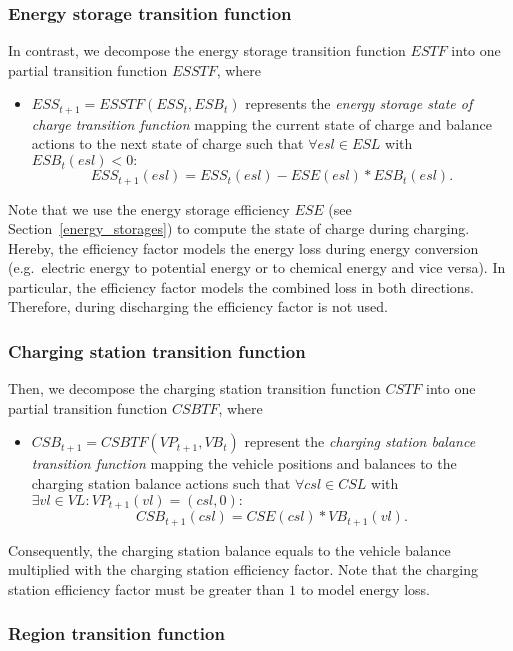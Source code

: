 \subsubsection{Energy storage transition function}
\label{transitions_storages}

In contrast, we decompose the energy storage transition function $ESTF$ into one partial transition function $ESSTF$, where
\begin{itemize}
	\item $ESS_{t+1} = ESSTF(ESS_t, ESB_t)$ represents the \textit{energy storage state of charge transition function} mapping the current state of charge and balance actions to the next state of charge such that $\forall esl \in ESL$ with $ESB_t(esl) < 0:$
	\[
		ESS_{t+1}(esl) = ESS_t(esl) - ESE(esl) * ESB_t(esl) \textrm{.}
	\]
\end{itemize}
Note that we use the energy storage efficiency $ESE$ (see Section~\ref{energy_storages}) to compute the state of charge during charging. Hereby, the efficiency factor models the energy loss during energy conversion (e.g.\ electric energy to potential energy or to chemical energy and vice versa). In particular, the efficiency factor models the combined loss in both directions. Therefore, during discharging the efficiency factor is not used.

\subsubsection{Charging station transition function}
\label{transitions_stations}

Then, we decompose the charging station transition function $CSTF$ into one partial transition function $CSBTF$, where
\begin{itemize}
	\item $CSB_{t+1} = CSBTF(VP_{t+1}, VB_t)$ represent the \textit{charging station balance transition function} mapping the vehicle positions and balances to the charging station balance actions such that $\forall csl \in CSL$ with $\exists vl \in VL: VP_{t+1}(vl) = (csl, 0):$
	\[
		CSB_{t+1}(csl) = CSE(csl) * VB_{t+1}(vl) \textrm{.}
	\]
\end{itemize}
Consequently, the charging station balance equals to the vehicle balance multiplied with the charging station efficiency factor. Note that the charging station efficiency factor must be greater than $1$ to model energy loss.

\subsubsection{Region transition function}
\label{transitions_regions}

